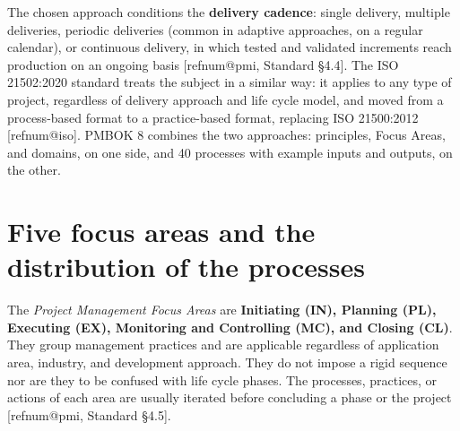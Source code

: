 \documentclass[11pt,a4paper]{article}
\makeatletter
\newcommand{\refnum}[1]{\csname refnum@#1\endcsname}
\makeatother
\begin{document}
The chosen approach conditions the \textbf{delivery cadence}: single delivery, multiple deliveries, periodic deliveries (common in adaptive approaches, on a regular calendar), or continuous delivery, in which tested and validated increments reach production on an ongoing basis [\refnum{pmi}, Standard §4.4]. The ISO 21502:2020 standard treats the subject in a similar way: it applies to any type of project, regardless of delivery approach and life cycle model, and moved from a process-based format to a practice-based format, replacing ISO 21500:2012 [\refnum{iso}]. PMBOK 8 combines the two approaches: principles, Focus Areas, and domains, on one side, and 40 processes with example inputs and outputs, on the other.

\section{Five focus areas and the distribution of the processes}

The \textit{Project Management Focus Areas} are \textbf{Initiating (IN), Planning (PL), Executing (EX), Monitoring and Controlling (MC), and Closing (CL)}. They group management practices and are applicable regardless of application area, industry, and development approach. They do not impose a rigid sequence nor are they to be confused with life cycle phases. The processes, practices, or actions of each area are usually iterated before concluding a phase or the project [\refnum{pmi}, Standard §4.5].
\end{document}
